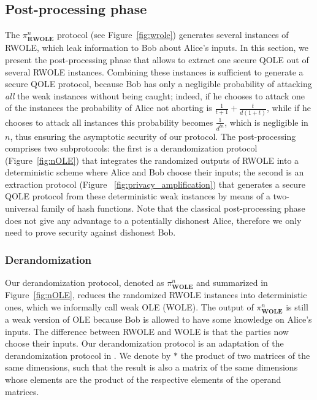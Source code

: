 \subsection{Post-processing phase}\label{qole_protocol}

The $\mathcal{\pi}^n_{\textbf{RWOLE}}$ protocol (see Figure~\ref{fig:wrole})  generates several instances of RWOLE, which leak information to Bob about Alice's inputs. In this section, we present the  post-processing phase that allows to extract one secure QOLE out of several RWOLE instances. Combining these instances is sufficient to generate a secure QOLE protocol, because Bob has only a negligible probability of attacking \textit{all} the weak instances without being caught; indeed, if he chooses to attack one of the instances the probability of Alice not aborting is $\frac{1}{t+1}+\frac{t}{d(1+t)}$, while if he chooses to attack all instances this probability becomes  $\frac{1}{d^{tn}}$, which is negligible in $n$, thus ensuring the asymptotic security of our protocol. The post-processing  comprises two subprotocols: the first is a derandomization protocol (Figure~\ref{fig:nOLE})  that integrates the randomized outputs of RWOLE into a deterministic scheme where Alice and Bob choose their inputs;   the second is an extraction protocol (Figure
~\ref{fig:privacy_amplification}) that generates a secure QOLE protocol from these deterministic weak instances by means of a two-universal family of hash functions.  Note that the classical post-processing phase does not give any advantage to a potentially dishonest Alice, therefore we only need to prove security against dishonest Bob.



\subsubsection{Derandomization}
Our derandomization protocol, denoted as  $\mathcal{\pi}^n_{\textbf{WOLE}}$ and summarized in Figure~\ref{fig:nOLE}, reduces the randomized RWOLE instances into deterministic ones, which we informally call  weak OLE (WOLE). The output of $\pi^n_{\textbf{WOLE}}$ is still a weak version of OLE because Bob is allowed to have some knowledge on Alice's inputs. The difference between RWOLE and WOLE is that the parties now  choose their inputs. 
Our derandomization protocol is an adaptation of the derandomization protocol in \cite{DHNO19}. We denote by $*$ the product of two matrices of the same dimensions, such that the result is also a matrix of the same dimensions whose elements are the product of the respective elements of the operand matrices.

